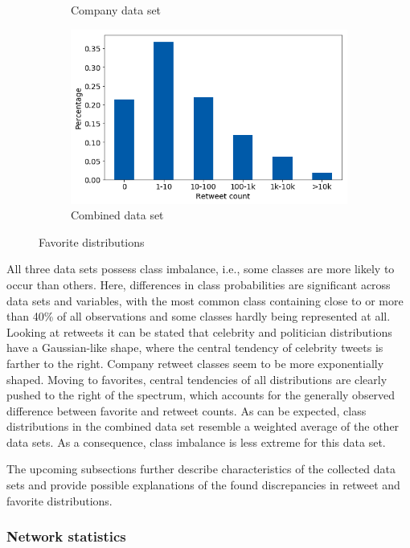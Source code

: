\begin{figure}[h]
\begin{subfigure}{.45\textwidth}
  \caption{Company data set}
  \label{fig:fav_distr_sub3}
\end{subfigure}%
\begin{subfigure}{.45\textwidth}
  \includegraphics[width=.95\linewidth]{img/comb_fav_distr}
  \caption{Combined data set}
  \label{fig:fav_distr_sub4}
\end{subfigure}%
\caption{Favorite distributions}
\label{fig:fav_distr}
\end{figure}

All three data sets possess class imbalance, i.e., some classes are more likely
to occur than others.
Here, differences in class probabilities are significant across data sets
and variables, with the most common class
containing close to or more than 40\% of all observations and some classes
hardly being represented at all.
Looking at retweets it can be stated that celebrity and politician distributions
have a Gaussian-like shape, where the central tendency of celebrity tweets is
farther to the right.
Company retweet classes seem to be more exponentially shaped.
Moving to favorites, central tendencies of all distributions are clearly pushed to the right of the
spectrum, which accounts for the generally observed difference between favorite
and retweet counts.
As can be expected, class distributions in the combined data set resemble a
weighted average of the other data sets.
As a consequence, class imbalance is less extreme for this data set.

The upcoming subsections further describe characteristics of the collected
data sets and provide possible explanations of the found discrepancies in
retweet and favorite distributions.

\subsubsection{Network statistics}
\label{sec:network_stats}


